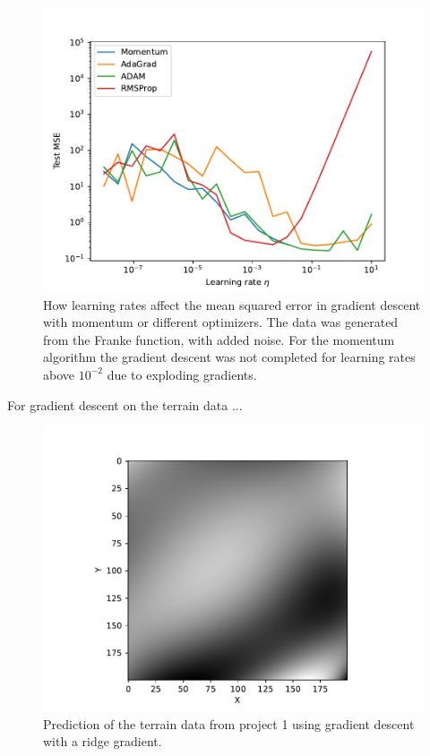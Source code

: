 \begin{figure}
    \centering
    \includegraphics[width=0.99\linewidth]{examples/tests_even/figs/Franke-learningrates-optimizers.pdf}
    \caption{How learning rates affect the mean squared error in gradient descent with momentum or different optimizers. The data was generated from the Franke function, with added noise. For the momentum algorithm the gradient descent was not completed for learning rates above $10^{-2}$ due to exploding gradients.}
    \label{fig:franke-learningrate}
\end{figure}

For gradient descent on the terrain data ...

\begin{figure}
    \centering
    \includegraphics[width=0.99\linewidth]{examples/tests_even/figs/gradient-descent-terrain-map.pdf}
    \caption{Prediction of the terrain data from project 1 using gradient descent with a ridge gradient.}
    \label{fig:enter-label}
\end{figure}



